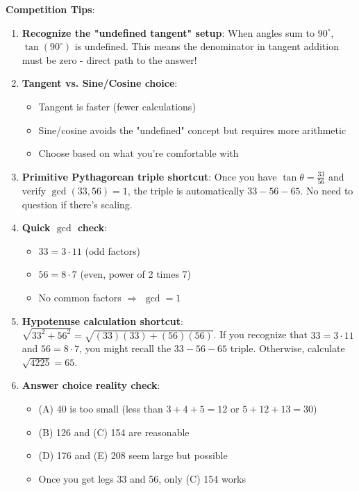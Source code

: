 \documentclass[12pt]{article}
\begin{document}
\begin{tipbox}
\textbf{Competition Tips}:

\begin{enumerate}
    \item \textbf{Recognize the "undefined tangent" setup}: When angles sum to $90^{\circ}$, $\tan(90^{\circ})$ is undefined. This means the denominator in tangent addition must be zero - direct path to the answer!
    
    \item \textbf{Tangent vs. Sine/Cosine choice}: 
    \begin{itemize}
        \item Tangent is faster (fewer calculations)
        \item Sine/cosine avoids the "undefined" concept but requires more arithmetic
        \item Choose based on what you're comfortable with
    \end{itemize}
    
    \item \textbf{Primitive Pythagorean triple shortcut}: Once you have $\tan\theta = \frac{33}{56}$ and verify $\gcd(33, 56) = 1$, the triple is automatically $33-56-65$. No need to question if there's scaling.
    
    \item \textbf{Quick $\gcd$ check}:
    \begin{itemize}
        \item $33 = 3 \cdot 11$ (odd factors)
        \item $56 = 8 \cdot 7$ (even, power of 2 times 7)
        \item No common factors $\Rightarrow$ $\gcd = 1$
    \end{itemize}
    
    \item \textbf{Hypotenuse calculation shortcut}: $\sqrt{33^2 + 56^2} = \sqrt{(33)(33) + (56)(56)}$. If you recognize that $33 = 3 \cdot 11$ and $56 = 8 \cdot 7$, you might recall the $33-56-65$ triple. Otherwise, calculate $\sqrt{4225} = 65$.
    
    \item \textbf{Answer choice reality check}: 
    \begin{itemize}
        \item (A) 40 is too small (less than $3 + 4 + 5 = 12$ or $5 + 12 + 13 = 30$)
        \item (B) 126 and (C) 154 are reasonable
        \item (D) 176 and (E) 208 seem large but possible
        \item Once you get legs 33 and 56, only (C) 154 works
    \end{itemize}
    

\end{enumerate}
\end{tipbox}
\end{document}
